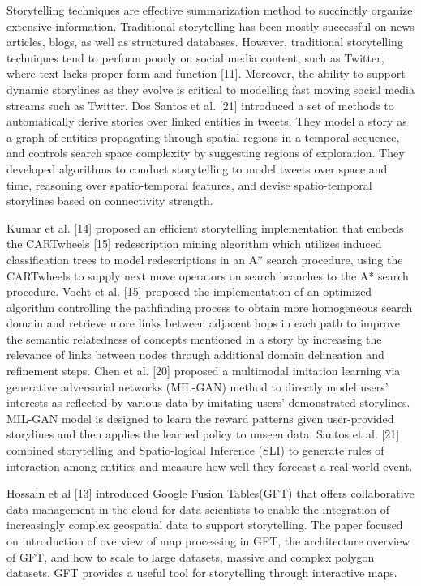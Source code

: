 \documentclass[conference]{IEEEtran}
\begin{document}
Storytelling techniques are effective summarization method to succinctly organize extensive information. Traditional storytelling has been mostly successful on news articles, blogs, as well as structured databases. However, traditional storytelling techniques tend to perform poorly on social media content, such as Twitter, where text lacks proper form and function [11]. Moreover, the ability to support dynamic storylines as they evolve is critical to modelling fast moving social media streams such as Twitter. Dos Santos et al. [21] introduced a set of methods to automatically derive stories over linked entities in tweets. They model a story as a graph of entities propagating through spatial regions in a temporal sequence, and controls search space complexity by suggesting regions of exploration. They developed algorithms to conduct storytelling to model tweets over space and time, reasoning over spatio-temporal features, and devise spatio-temporal storylines based on connectivity strength.

Kumar et al. [14] proposed an efficient storytelling implementation that embeds the CARTwheels [15] redescription mining algorithm which utilizes induced classification trees to model redescriptions in an A* search procedure, using the CARTwheels to supply next move operators on search branches to the A* search procedure. Vocht et al. [15] proposed the implementation of an optimized algorithm controlling the pathfinding process to obtain more homogeneous search domain and retrieve more links between adjacent hops in each path to improve the semantic relatedness of concepts mentioned in a story by increasing the relevance of links between nodes through additional domain delineation and refinement steps. Chen et al. [20] proposed a multimodal imitation learning via generative adversarial networks (MIL-GAN) method to directly model users' interests as reflected by various data by imitating users' demonstrated storylines. MIL-GAN model is designed to learn the reward patterns given user-provided storylines and then applies the learned policy to unseen data. Santos et al. [21] combined storytelling and Spatio-logical Inference (SLI) to generate rules of interaction among entities and measure how well they forecast a real-world event. 



Hossain et al [13] introduced Google Fusion Tables(GFT) that offers collaborative data management in the cloud for data scientists to enable the integration of increasingly complex geospatial data to support storytelling. The paper focused on introduction of overview of map processing in GFT, the architecture overview of GFT, and how to scale to large datasets, massive and complex polygon datasets. GFT provides a useful tool for storytelling through interactive maps. 
\end{document}
